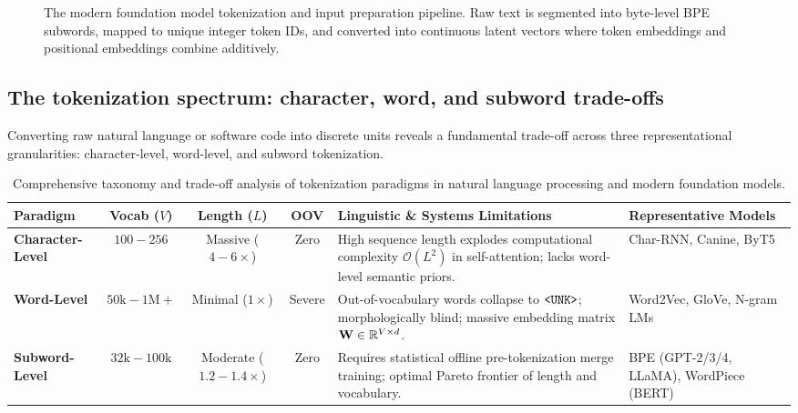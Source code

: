 \documentclass[../../main.tex]{subfiles}
\begin{document}
\begin{figure}[htbp]
\caption{The modern foundation model tokenization and input preparation pipeline. Raw text is segmented into byte-level BPE subwords, mapped to unique integer token IDs, and converted into continuous latent vectors where token embeddings and positional embeddings combine additively.}
\label{fig:modern_tokenization_pipeline}
\end{figure}

\subsection{The tokenization spectrum: character, word, and subword trade-offs}
\label{subsec:tokenization_spectrum}

Converting raw natural language or software code into discrete units reveals a fundamental trade-off across three representational granularities: character-level, word-level, and subword tokenization.

\begin{table}[htbp]
\centering
\footnotesize
\caption{Comprehensive taxonomy and trade-off analysis of tokenization paradigms in natural language processing and modern foundation models.}
\label{tab:tokenization_tradeoffs}
\begin{tabularx}{\textwidth}{l c c c >{\raggedright\arraybackslash}X >{\raggedright\arraybackslash}p{2.6cm}}
\toprule
\textbf{Paradigm} & \textbf{Vocab ($V$)} & \textbf{Length ($L$)} & \textbf{OOV} & \textbf{Linguistic \& Systems Limitations} & \textbf{Representative Models} \\
\midrule
\textbf{Character-Level} & $100 - 256$ & Massive ($4-6\times$) & Zero & High sequence length explodes computational complexity $\mathcal{O}(L^2)$ in self-attention; lacks word-level semantic priors. & Char-RNN, Canine, ByT5 \\
\addlinespace[3pt]
\textbf{Word-Level} & $50\text{k} - 1\text{M}+$ & Minimal ($1\times$) & Severe & Out-of-vocabulary words collapse to $\text{\texttt{<UNK>}}$; morphologically blind; massive embedding matrix $\mathbf{W} \in \mathbb{R}^{V \times d}$. & Word2Vec, GloVe, N-gram LMs \\
\addlinespace[3pt]
\textbf{Subword-Level} & $32\text{k} - 100\text{k}$ & Moderate ($1.2-1.4\times$) & Zero & Requires statistical offline pre-tokenization merge training; optimal Pareto frontier of length and vocabulary. & BPE (GPT-2/3/4, LLaMA), WordPiece (BERT) \\
\bottomrule
\end{tabularx}
\end{table}
\end{document}
